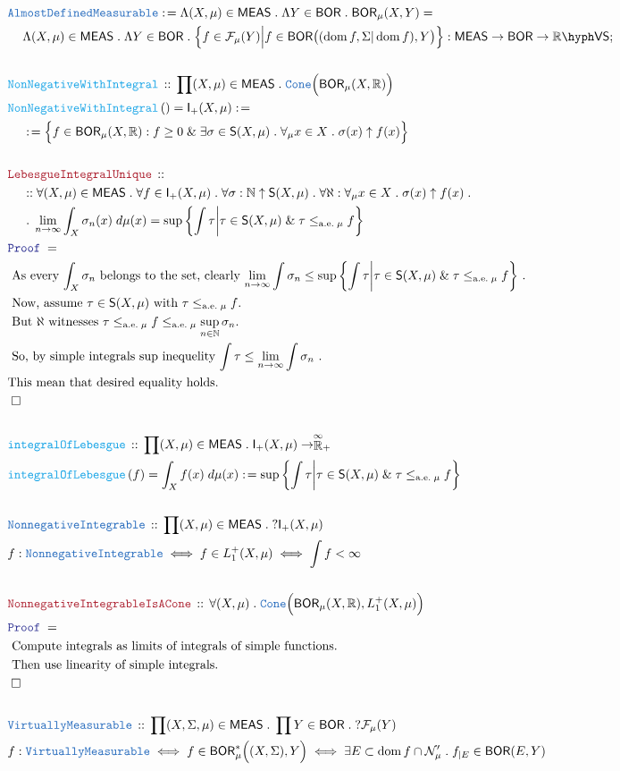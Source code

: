 \documentclass[12pt]{scrartcl}
\newcommand{\TYPE}[1]{\textcolor{NavyBlue}{\mathtt{#1}}}
\newcommand{\FUNC}[1]{\textcolor{Cerulean}{\mathtt{#1}}}
\newcommand{\LOGIC}[1]{\textcolor{Blue}{\mathtt{#1}}}
\newcommand{\THM}[1]{\textcolor{Maroon}{\mathtt{#1}}}
\renewcommand{\.}{\; . \;}
\newcommand{\de}{: \kern 0.1pc =}
\newcommand{\Act}[1]{\left( #1 \right)}
\newcommand{\Theorem}[2]{& \THM{#1} \, :: \, #2 \\ & \Proof = \\ }
\newcommand{\DeclareType}[2]{& \TYPE{#1} \, :: \, #2 \\}
\newcommand{\DefineNamedType}[4]{& #1 : \TYPE{#2} \iff #3 \iff #4 \\}
\newcommand{\DeclareFunc}[2]{& \FUNC{#1} \, :: \, #2 \\}
\newcommand{\DefineNamedFunc}[4]{&  \FUNC{#1}\Act{#2} = #3 \de #4 \\}
\newcommand{\NewLine}{\\ & \kern 1pc}
\newcommand{\Page}[1]{ \begin{align*} #1 \end{align*}   }
\renewcommand{\And}{\; \& \;}
\newcommand{\Reals}{\mathbb{R} }
\newcommand{\Nat}{\mathbb{N} }
\newcommand{\EReals}{\stackrel{\mathclap{\infty}}{\mathbb{R}}}
\newcommand{\Conclude}[3]{& #1 \de #2 : #3; \\}
\newcommand{\QED}{\; \square}
\newcommand{\EndProof}{& \QED \\}
\newcommand{\Proof}{\LOGIC{Proof} \; }
\newcommand{\Explain}[1]{& \text{#1.} \\}
\DeclareMathOperator*{\dom}{dom}
\newcommand{\BOR}{\mathsf{BOR}}
\newcommand{\VS}[1]{#1\hyph\mathsf{VS}} %
\newcommand{\Null}{\mathcal{N}}
\renewcommand{\ae}{\mathrm{a.e.}}
\newcommand{\Integrable}{\mathsf{I}}
\newcommand{\F}{\mathcal{F}}
\newcommand{\MEAS}{\mathsf{MEAS}}
\newcommand{\Simple}{\mathsf{S}}
\begin{document}
\Page{
	\Conclude{\TYPE{AlmostDefinedMeasurable}}
	{
		\Lambda (X,\mu) \in \MEAS \.
		\Lambda  Y \in \BOR \.
		\BOR_\mu(X,Y)  = \NewLine 
		\Lambda (X,\mu) \in \MEAS \.
		\Lambda  Y \in \BOR \.
		\Big\{  f \in \F_\mu(Y)  \Big|  f \in \BOR\big( (\dom f,\Sigma|\dom f),Y\big)   \Big\}
	}{
		\MEAS \to \BOR \to \VS{\Reals}
	}
	\\
	\DeclareFunc{NonNegativeWithIntegral}{
		\prod (X,\mu) \in \MEAS \. \TYPE{Cone}\Big(\BOR_\mu(X,\Reals)\Big)}
	\DefineNamedFunc{NonNegativeWithIntegral}{}{\Integrable_+(X,\mu)}
	{
		\NewLine \de		
		\Big\{ 
			f \in   \BOR_\mu(X,\Reals) : f \geq 0 \And \exists \sigma \in \Simple(X,\mu)  \.
				\forall_\mu x \in X \. \sigma(x) \uparrow f(x)    
		\Big\}
	}
	\\
	\Theorem{LebesgueIntegralUnique}
	{
		\NewLine ::		
		\forall (X,\mu) \in \MEAS \.
		\forall f \in \Integrable_+(X, \mu) \.
		\forall \sigma : \Nat \uparrow \Simple(X,\mu) \.
		\forall \aleph : \forall_\mu x \in X \.    \sigma(x) \uparrow f(x) \. \NewLine \.
		\lim_{n \to \infty}\int_X \sigma_n(x) \; d\mu(x) = 
		\sup \left\{  \int \tau  \bigg| \tau \in \Simple(X,\mu) \And \tau \le_{\ae \; \mu} f \right\} 
	}
	\Explain{
		As every $\int_X \sigma_n $ belongs to the set, clearly
		$\lim_{n \to \infty} \int \sigma_n \le 
		\sup \left\{  \int \tau  \bigg| \tau \in \Simple(X,\mu) \And \tau \le_{\ae \; \mu} f \right\} $
	}
	\Explain{ Now, assume $\tau \in \Simple(X,\mu)$ with  $\tau \le_{\ae \; \mu} f $}
	\Explain{ But $\aleph$ 
		witnesses $\tau \le_{\ae \; \mu} f \le _{\ae \; \mu} \sup_{n \in \Nat } \sigma_n $}
	\Explain{
		So, by simple integrals sup inequelity
		$ \int \tau \le \lim_{n \to \infty} \int \sigma_n$
	}
	\Explain{This mean that desired equality holds}
	\EndProof
	\\
	\DeclareFunc{integralOfLebesgue}
	{
		\prod (X,\mu) \in \MEAS \. \Integrable_+(X,\mu) \to \EReals_+
	}
	\DefineNamedFunc{integralOfLebesgue}{f}{\int_X f(x) \; d\mu(x)}	
	{
		\sup \left\{  \int \tau  \bigg| \tau \in \Simple(X,\mu) \And \tau \le_{\ae \; \mu} f \right\}
	}
	\\
	\DeclareType{NonnegativeIntegrable}
	{
		\prod (X,\mu) \in \MEAS \. ?\Integrable_+(X,\mu)
	}
	\DefineNamedType{f}{NonnegativeIntegrable}{f \in L_{1}^{+}(X,\mu)}	
	{
		\int f < \infty
	}
	\\
	\Theorem{NonnegativeIntegrableIsACone}
	{
		\forall (X,\mu) \. \TYPE{Cone}\Big( \BOR_\mu(X,\Reals), L_{1}^{+}(X,\mu) \Big)
	}
	\Explain{ Compute integrals as limits of integrals of simple functions}
	\Explain{ Then use linearity of simple integrals}
	\EndProof
	\\
	\DeclareType{VirtuallyMeasurable}
	{\prod (X,\Sigma,\mu) \in \MEAS \. \prod Y \in \BOR \.  ?\F_\mu(Y)}
	\DefineNamedType{f}{VirtuallyMeasurable}
	{
	  		f \in \BOR_\mu^*\Big((X,\Sigma), Y \Big)
	}
	{
		\exists E \subset \dom f  \cap \Null'_\mu \. 
		f_{|E} \in \BOR(E,Y)		
	}
}	
\end{document}
